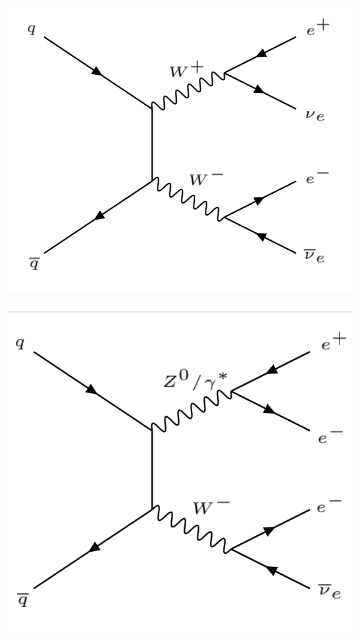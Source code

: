 \documentclass{article}
\begin{document}
\begin{figure}[htb]
    \centering
    \begin{subfigure}{.25\textwidth}
        \includegraphics[height=\textwidth]{images/WW.png}
        \caption{}
        \label{fig:bckgFeynman_WW}
    \end{subfigure}
    \begin{subfigure}{.25\textwidth}
        \includegraphics[height=\textwidth]{images/WZ.png}

\end{subfigure}
\end{figure}
\end{document}
